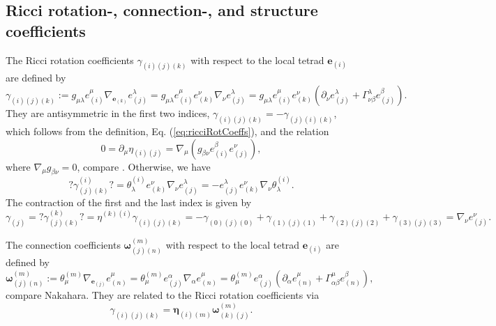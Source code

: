 \documentclass[10pt,twoside,notitlepage,a4paper,fleqn,openbib]{report}
\def\defequal{:=}
\begin{document}
\subsection{Ricci rotation-, connection-, and structure coefficients}
The Ricci rotation coefficients $\gamma_{(i)(j)(k)}$ with respect to the local tetrad $\mathbf{e}_{(i)}$ are defined by 
\begin{equation}
  \label{eq:ricciRotCoeffs}
 \gamma_{(i)(j)(k)} \defequal g_{\mu\lambda}e_{(i)}^{\mu}\nabla_{\mathbf{e}_{(k)}}e_{(j)}^{\lambda} = g_{\mu\lambda} e_{(i)}^{\mu}e_{(k)}^{\nu}\nabla_{\nu}e_{(j)}^{\lambda} = g_{\mu\lambda} e_{(i)}^{\mu}e_{(k)}^{\nu}\left(\partial_{\nu}e_{(j)}^{\lambda}+\Gamma_{\nu\beta}^{\lambda}e_{(j)}^{\beta}\right).
\end{equation}
They are antisymmetric in the first two indices, $\gamma_{(i)(j)(k)} = -\gamma_{(j)(i)(k)}$, which follows from the definition, Eq. (\ref{eq:ricciRotCoeffs}), and the relation
\begin{equation}
 0 = \partial_{\mu}\eta_{(i)(j)} = \nabla_{\mu}\left(g_{\beta\nu}e_{(i)}^{\beta}e_{(j)}^{\nu}\right),
\end{equation}
where $\nabla_{\mu}g_{\beta\nu}=0$, compare \cite{chandrasekhar2006}. Otherwise, we have
\begin{equation}
 ?\gamma^{(i)}_{(j)(k)}? = \theta_{\lambda}^{(i)}e_{(k)}^{\nu}\nabla_{\nu}e_{(j)}^{\lambda} = -e_{(j)}^{\lambda}e_{(k)}^{\nu}\nabla_{\nu}\theta_{\lambda}^{(i)}.
\end{equation}
The contraction of the first and the last index is given by
\begin{equation}
 \gamma_{(j)} = ?\gamma^{(k)}_{(j)(k)}? = \eta^{(k)(i)}\gamma_{(i)(j)(k)} = -\gamma_{(0)(j)(0)}+\gamma_{(1)(j)(1)}+\gamma_{(2)(j)(2)}+\gamma_{(3)(j)(3)} = \nabla_{\nu}e_{(j)}^{\nu}.
\end{equation}


The connection coefficients $\boldsymbol{\omega}_{(j)(n)}^{(m)}$ with respect to the local tetrad $\mathbf{e}_{(i)}$ are defined by
\begin{equation}
 \boldsymbol{\omega}_{(j)(n)}^{(m)}\defequal\theta^{(m)}_{\mu}\nabla_{\mathbf{e}_{(j)}}e_{(n)}^{\mu}= \theta^{(m)}_{\mu}e_{(j)}^{\alpha}\nabla_{\alpha}e_{(n)}^{\mu}=\theta^{(m)}_{\mu}e_{(j)}^{\alpha}\left(\partial_{\alpha}e_{(n)}^{\mu}+\Gamma_{\alpha\beta}^{\mu}e_{(n)}^{\beta}\right),
\end{equation}
compare Nakahara\cite{nakahara}. They are related to the Ricci rotation coefficients via
\begin{equation}
 \gamma_{(i)(j)(k)} = \boldsymbol{\eta}_{(i)(m)}\boldsymbol{\omega}_{(k)(j)}^{(m)}.
\end{equation}
\end{document}
